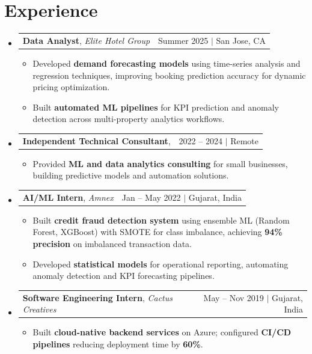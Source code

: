 \documentclass[letterpaper,10pt]{article}
\makeatletter
\newcommand{\resumeItem}[1]{\item\small{#1 \vspace{-3pt}}}
\newcommand{\resumeExpHeading}[4]{
  \vspace{-3pt}\item
    \begin{tabular*}{0.97\textwidth}[t]{l@{\extracolsep{\fill}}r}
      \textbf{#1}, \textit{#3} & #2 \\
    \end{tabular*}\vspace{-8pt}
}
\newcommand{\resumeSubHeadingListStart}{\begin{itemize}[leftmargin=0.12in, label={}]}
\newcommand{\resumeSubHeadingListEnd}{\end{itemize}}
\newcommand{\resumeItemListStart}{\begin{itemize}[leftmargin=0.15in]}
\newcommand{\resumeItemListEnd}{\end{itemize}\vspace{-6pt}}
\makeatother
\begin{document}
\section{Experience}
  \resumeSubHeadingListStart

    \resumeExpHeading
      {Data Analyst}{Summer 2025 $|$ San Jose, CA}
      {Elite Hotel Group}{}
      \resumeItemListStart
        \resumeItem{Developed \textbf{demand forecasting models} using time-series analysis and regression techniques, improving booking prediction accuracy for dynamic pricing optimization.}
        \resumeItem{Built \textbf{automated ML pipelines} for KPI prediction and anomaly detection across multi-property analytics workflows.}
      \resumeItemListEnd

    \resumeExpHeading
      {Independent Technical Consultant}{2022 -- 2024 $|$ Remote}
      {}{}
      \resumeItemListStart
        \resumeItem{Provided \textbf{ML and data analytics consulting} for small businesses, building predictive models and automation solutions.}
      \resumeItemListEnd

    \resumeExpHeading
      {AI/ML Intern}{Jan -- May 2022 $|$ Gujarat, India}
      {Amnex}{}
      \resumeItemListStart
        \resumeItem{Built \textbf{credit fraud detection system} using ensemble ML (Random Forest, XGBoost) with SMOTE for class imbalance, achieving \textbf{94\% precision} on imbalanced transaction data.}
        \resumeItem{Developed \textbf{statistical models} for operational reporting, automating anomaly detection and KPI forecasting pipelines.}
      \resumeItemListEnd

    \resumeExpHeading
      {Software Engineering Intern}{May -- Nov 2019 $|$ Gujarat, India}
      {Cactus Creatives}{}
      \resumeItemListStart
        \resumeItem{Built \textbf{cloud-native backend services} on Azure; configured \textbf{CI/CD pipelines} reducing deployment time by \textbf{60\%}.}
      \resumeItemListEnd

  \resumeSubHeadingListEnd

\end{document}
